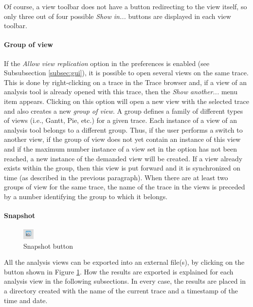 \documentclass[twoside]{article}
\begin{document}
\begin{sloppypar}
Of course, a view toolbar does not have a button redirecting to the view itself, so only three out of four possible \emph{Show in...} buttons are displayed in each view toolbar.

\paragraph{Group of view}
If the \emph{Allow view replication} option in the preferences is enabled (see Subsubsection \ref{subsec:gui}), it is possible to open several views on the same trace. This is done by right-clicking on a trace in the Trace browser and, if a view of an analysis tool is already opened with this trace, then the \emph{Show another...} menu item appears. Clicking on this option will open a new view with the selected trace and also creates a new \emph{group of view}. A group defines a family of different types of views (i.e., Gantt, Pie, etc.) for a given trace. Each instance of a view of an analysis tool belongs to a different group. Thus, if the user performs a switch to another view, if the group of view does not yet contain an instance of this view and if the maximum number instance of a view set in the option has not been reached, a new instance of the demanded view will be created. If a view already exists within the group, then this view is put forward and it is synchronized on time (as described in the previous paragraph).  When there are at least two groups of view for the same trace, the name of the trace in the views is preceded by a number identifying the group to which it belongs.

\paragraph{Snapshot}
\begin{figure}[h!]
  \centering
    \includegraphics[width=0.05\textwidth]{images/snapshot_icon.png}
  \caption{Snapshot button}
  \label{fig:snapshot}
\end{figure}

All the analysis views can be exported into an external file(s), by clicking on the button shown in Figure \ref{fig:snapshot}.
How the results are exported is explained for each analysis view in the following subsections.
In every case, the results are placed in a directory created with the name of the current trace and a timestamp of the time and date.


\end{sloppypar}
\end{document}
